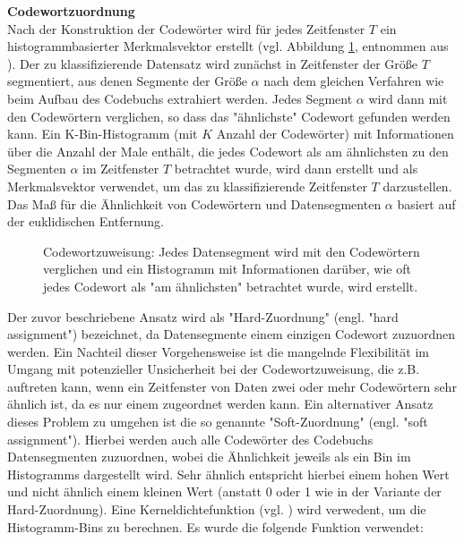 \textbf{Codewortzuordnung \\}
Nach der Konstruktion der Codewörter wird für jedes Zeitfenster $T$ ein histogrammbasierter Merkmalsvektor erstellt (vgl. Abbildung \ref{fig:ca_assignment}, entnommen aus \cite{kimiaki_codebook_approach_2016}). 
Der zu klassifizierende Datensatz wird zunächst in Zeitfenster der Größe $T$ segmentiert, aus denen Segmente der Größe $\alpha$ nach dem gleichen Verfahren wie beim Aufbau des Codebuchs extrahiert werden. 
Jedes Segment $\alpha$ wird dann mit den Codewörtern verglichen, so dass das "ähnlichste" Codewort gefunden werden kann. 
Ein K-Bin-Histogramm (mit $K$ Anzahl der Codewörter) mit Informationen über die Anzahl der Male enthält, die jedes Codewort als am ähnlichsten zu den Segmenten $\alpha$ im Zeitfenster $T$ betrachtet wurde, wird dann erstellt und als Merkmalsvektor verwendet, um das zu klassifizierende Zeitfenster $T$ darzustellen. 
Das Maß für die Ähnlichkeit von Codewörtern und Datensegmenten $\alpha$ basiert auf der euklidischen Entfernung. \\


\begin{figure}[h]
\caption{ Codewortzuweisung: Jedes Datensegment wird mit den Codewörtern verglichen und ein Histogramm mit Informationen darüber, wie oft jedes Codewort als "am ähnlichsten" betrachtet wurde, wird erstellt. }
\label{fig:ca_assignment} \end{figure} \vspace{0.5cm}


Der zuvor beschriebene Ansatz wird als "Hard-Zuordnung" (engl. "hard assignment") bezeichnet, da Datensegmente einem einzigen Codewort zuzuordnen werden.
Ein Nachteil dieser Vorgehensweise ist die mangelnde Flexibilität im Umgang mit potenzieller Unsicherheit bei der Codewortzuweisung, die z.B. auftreten kann, wenn ein Zeitfenster von Daten zwei oder mehr Codewörtern sehr ähnlich ist, da es nur einem zugeordnet werden kann. 
Ein alternativer Ansatz dieses Problem zu umgehen ist die so genannte "Soft-Zuordnung" (engl. "soft assignment"). Hierbei werden auch alle Codewörter des Codebuchs Datensegmenten zuzuordnen, wobei die Ähnlichkeit jeweils als ein Bin im Histogramms dargestellt wird. Sehr ähnlich entspricht hierbei einem hohen Wert und nicht ähnlich einem kleinen Wert (anstatt 0 oder 1 wie in der Variante der Hard-Zuordnung). 
Eine Kerneldichtefunktion (vgl. \cite{gemert_ieee_2009}) wird verwedent, um die Histogramm-Bins zu berechnen. Es wurde die folgende Funktion verwendet:


